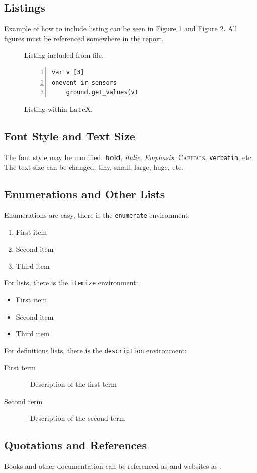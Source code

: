 \documentclass[12pt,a4paper]{article}
\begin{document}
\subsection{Listings}
Example of how to include listing can be seen in Figure \ref{fig:listing1} and Figure \ref{fig:listing2}. All figures must be referenced somewhere in the report.
\begin{figure}

\caption{Listing included from file.}
\label{fig:listing1}
\end{figure}
\begin{figure}
\begin{lstlisting}[basicstyle=\ttfamily, frame=single, tabsize=4, numbers=left]
var v [3]
onevent ir_sensors
	ground.get_values(v)
\end{lstlisting}
\caption{Listing within \LaTeX{}.}
\label{fig:listing2}
\end{figure}

\subsection{Font Style and Text Size}
The font style may be modified: \textbf{bold}, \textit{italic}, \emph{Emphasis}, \textsc{Capitals}, \verb|verbatim|, etc.\\
The text size can be changed: \tiny tiny, \small small, \large large, \huge huge, \normalsize etc.

\subsection{Enumerations and Other Lists}
Enumerations are easy, there is the
\texttt{enumerate} environment:
%
\begin{enumerate}
  \item First item
  \item Second item
  \item Third item
\end{enumerate}

\noindent For lists, there is the
\texttt{itemize} environment:
%
\begin{itemize}
  \item First item
  \item Second item
  \item Third item
\end{itemize}

\noindent For definitions lists, there is the \texttt{description} environment:
\begin{description}
\item[First term] -- Description of the first term
\item[Second term] -- Description of the second term
\end{description}

\subsection{Quotations and References}
Books and other documentation can be referenced as \cite{Braitenberg} and
websites as \cite{AsebaManual}.
\end{document}
